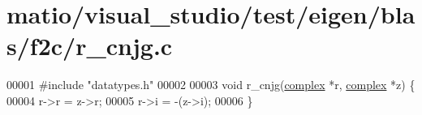 \hypertarget{matio_2visual__studio_2test_2eigen_2blas_2f2c_2r__cnjg_8c_source}{}\section{matio/visual\+\_\+studio/test/eigen/blas/f2c/r\+\_\+cnjg.c}
\label{matio_2visual__studio_2test_2eigen_2blas_2f2c_2r__cnjg_8c_source}

\begin{DoxyCode}
00001 \textcolor{preprocessor}{#include "datatypes.h"}    
00002 
00003 \textcolor{keywordtype}{void} r\_cnjg(\hyperlink{structcomplex}{complex} *r, \hyperlink{structcomplex}{complex} *z) \{
00004     r->r = z->r;
00005     r->i = -(z->i);
00006 \}
\end{DoxyCode}
